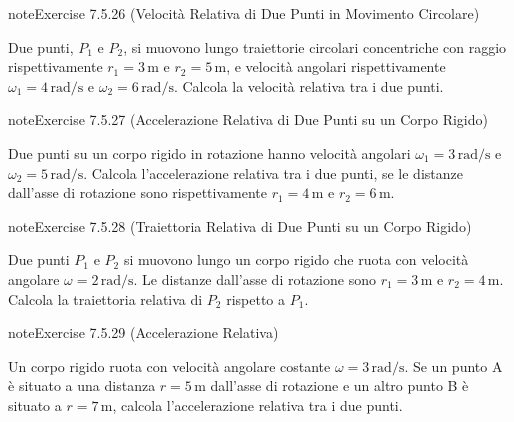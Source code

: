 \documentclass[letterpaper,10pt,italian]{jupyterBook}
\begin{document}
\begin{sphinxadmonition}{note}{Exercise 7.5.26 (Velocità Relativa di Due Punti in Movimento Circolare)}



\sphinxAtStartPar
Due punti, \(P_1\) e \(P_2\), si muovono lungo traiettorie circolari concentriche con raggio rispettivamente \(r_1 = 3 \, \text{m}\) e \(r_2 = 5 \, \text{m}\), e velocità angolari rispettivamente \(\omega_1 = 4 \, \text{rad/s}\) e \(\omega_2 = 6 \, \text{rad/s}\). Calcola la velocità relativa tra i due punti.
\end{sphinxadmonition}
 \label{exercise:ch/mechanics/kinematics-problems-exercise-26}

\begin{sphinxadmonition}{note}{Exercise 7.5.27 (Accelerazione Relativa di Due Punti su un Corpo Rigido)}



\sphinxAtStartPar
Due punti su un corpo rigido in rotazione hanno velocità angolari \(\omega_1 = 3 \, \text{rad/s}\) e \(\omega_2 = 5 \, \text{rad/s}\). Calcola l’accelerazione relativa tra i due punti, se le distanze dall’asse di rotazione sono rispettivamente \(r_1 = 4 \, \text{m}\) e \(r_2 = 6 \, \text{m}\).
\end{sphinxadmonition}
 \label{exercise:ch/mechanics/kinematics-problems-exercise-27}

\begin{sphinxadmonition}{note}{Exercise 7.5.28 (Traiettoria Relativa di Due Punti su un Corpo Rigido)}



\sphinxAtStartPar
Due punti \(P_1\) e \(P_2\) si muovono lungo un corpo rigido che ruota con velocità angolare \(\omega = 2 \, \text{rad/s}\). Le distanze dall’asse di rotazione sono \(r_1 = 3 \, \text{m}\) e \(r_2 = 4 \, \text{m}\). Calcola la traiettoria relativa di \(P_2\) rispetto a \(P_1\).
\end{sphinxadmonition}
 \label{exercise:ch/mechanics/kinematics-problems-exercise-28}

\begin{sphinxadmonition}{note}{Exercise 7.5.29 (Accelerazione Relativa)}



\sphinxAtStartPar
Un corpo rigido ruota con velocità angolare costante \(\omega = 3 \, \text{rad/s}\). Se un punto A è situato a una distanza \(r = 5 \, \text{m}\) dall’asse di rotazione e un altro punto B è situato a \(r = 7 \, \text{m}\), calcola l’accelerazione relativa tra i due punti.
\end{sphinxadmonition}
\end{document}
